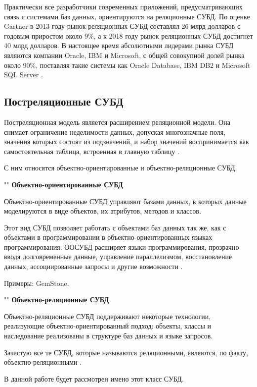 \documentclass[a4paper,14pt]{extreport}
\begin{document}
Практически все разработчики современных приложений, предусматривающих связь с системами баз данных, ориентируются на реляционные СУБД. По оценке Gartner в 2013 году рынок реляционных СУБД составлял 26 млрд долларов с годовым приростом около 9\%, а к 2018 году рынок реляционных СУБД достигнет 40 млрд долларов. В настоящее время абсолютными лидерами рынка СУБД являются компании Oracle, IBM и Microsoft, с общей совокупной долей рынка около 90\%, поставляя такие системы как Oracle Database, IBM DB2 и Microsoft SQL Server \cite{dbms}.


\subsection*{Постреляционные СУБД}

Постреляционная модель является расширением реляционной модели. Она снимает ограничение неделимости данных, допуская многозначные поля, значения которых состоят из подзначений, и набор значений воспринимается как самостоятельная таблица, встроенная в главную таблицу \cite{post_rel}.

С ним относятся объектно-ориентированные и объектно-реляционные СУБД.

""\newline
\noindent\textbf{Объектно-ориентированные СУБД}

Объектно-ориентированные СУБД управляют базами данных, в которых данные моделируются в виде объектов, их атрибутов, методов и классов.

Этот вид СУБД позволяет работать с объектами баз данных так же, как с объектами в программировании в объектно-ориентированных языках программирования. ООСУБД расширяет языки программирования, прозрачно вводя долговременные данные, управление параллелизмом, восстановление данных, ассоциированные запросы и другие возможности  \cite{dbms}.

Примеры: GemStone.

""\newline
\noindent\textbf{Объектно-реляционные СУБД}

Объектно-реляционные СУБД поддерживают некоторые технологии, реализующие объектно-ориентированный подход: объекты, классы и наследование реализованы в структуре баз данных и языке запросов.

Зачастую все те СУБД, которые называются реляционными, являются, по факту, объектно-реляционными \cite{dbms}.

В данной работе будет рассмотрен имено этот класс СУБД.
\end{document}
